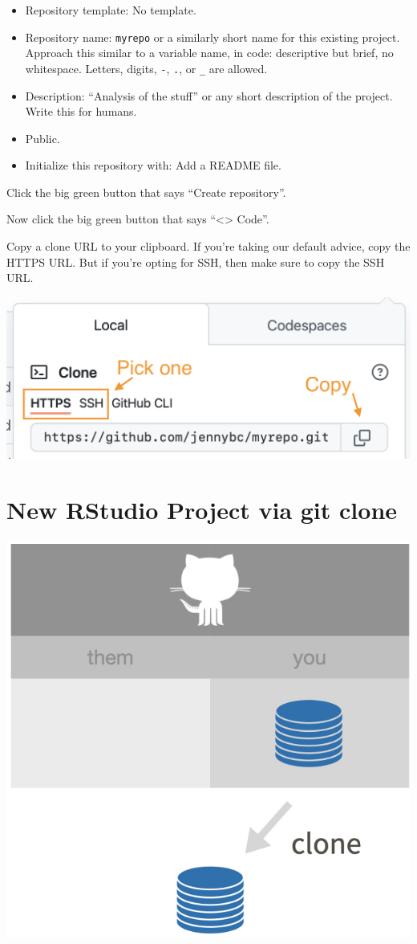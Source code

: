 \documentclass[
]{book}
\providecommand{\tightlist}{%
  \setlength{\itemsep}{0pt}\setlength{\parskip}{0pt}}
\begin{document}
\begin{itemize}
\tightlist
\item
  Repository template: No template.
\item
  Repository name: \texttt{myrepo} or a similarly short name for this existing project. Approach this similar to a variable name, in code: descriptive but brief, no whitespace. Letters, digits, \texttt{-}, \texttt{.}, or \texttt{\_} are allowed.
\item
  Description: ``Analysis of the stuff'' or any short description of the project. Write this for humans.
\item
  Public.
\item
  Initialize this repository with: Add a README file.
\end{itemize}

Click the big green button that says ``Create repository''.

Now click the big green button that says ``\textless\textgreater{} Code''.

Copy a clone URL to your clipboard.
If you're taking our default advice, copy the HTTPS URL.
But if you're opting for SSH, then make sure to copy the SSH URL.

\begin{center}\includegraphics[width=0.6\linewidth]{img/github-https-or-ssh-url-annotated} \end{center}

\section{New RStudio Project via git clone}\label{git-clone-usethis-rstudio}

\begin{center}\includegraphics[width=0.6\linewidth]{img/new-project-github-first} \end{center}
\end{document}
